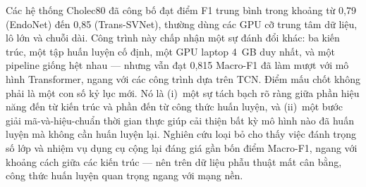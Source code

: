 \documentclass[11pt,a4paper]{report}
\begin{document}
Các hệ thống Cholec80 đã công bố đạt điểm F1 trung bình trong khoảng từ 0,79 (EndoNet) đến 0,85 (Trans-SVNet), thường dùng các GPU cỡ trung tâm dữ liệu, lô lớn và chuỗi dài. Công trình này chấp nhận một sự đánh đổi khác: ba kiến trúc, một tập huấn luyện cố định, một GPU laptop 4~GB duy nhất, và một pipeline giống hệt nhau --- nhưng vẫn đạt 0,815 Macro-F1 đã làm mượt với mô hình Transformer, ngang với các công trình dựa trên TCN. Điểm mấu chốt không phải là một con số kỷ lục mới. Nó là (i)~một sự tách bạch rõ ràng giữa phần hiệu năng đến từ kiến trúc và phần đến từ công thức huấn luyện, và (ii)~một bước giải mã-và-hiệu-chuẩn thời gian thực giúp cải thiện bất kỳ mô hình nào đã huấn luyện mà không cần huấn luyện lại. Nghiên cứu loại bỏ cho thấy việc đánh trọng số lớp và nhiệm vụ dụng cụ cộng lại đáng giá gần bốn điểm Macro-F1, ngang với khoảng cách giữa các kiến trúc --- nên trên dữ liệu phẫu thuật mất cân bằng, công thức huấn luyện quan trọng ngang với mạng nền.





\end{document}
